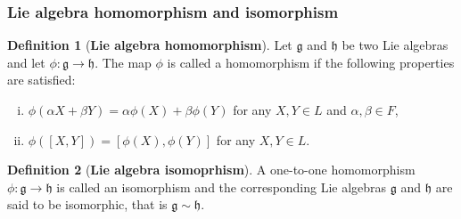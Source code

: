 \documentclass[12pt,a4paper]{report}
\theoremstyle{definition}
\newtheorem{definition}{Definition}
\theoremstyle{remark}
\theoremstyle{remark}
\begin{document}
\subsubsection{Lie algebra homomorphism and isomorphism}
\begin{definition}[\textbf{Lie algebra homomorphism}]
Let $\mathfrak{g}$ and $\mathfrak{h}$ be two Lie algebras and let $\phi:\mathfrak{g}\rightarrow\mathfrak{h}$. The map $\phi$ is called a homomorphism if the following properties are satisfied:
\begin{enumerate}[i.]
\item $\phi(\alpha X+\beta Y)=\alpha\phi(X)+\beta\phi(Y)$ for any $X,Y\in L$ and $\alpha,\beta\in F$,
\item $\phi([X,Y])=[\phi(X),\phi(Y)]$ for any $X,Y\in L$.
\end{enumerate}
\end{definition}
\begin{definition}[\textbf{Lie algebra isomoprhism}]
A one-to-one homomorphism $\phi:\mathfrak{g}\rightarrow\mathfrak{h}$ is called an isomorphism and the corresponding Lie algebras $\mathfrak{g}$ and $\mathfrak{h}$ are said to be isomorphic, that is $\mathfrak{g}\sim\mathfrak{h}$.
\end{definition}
\end{document}

